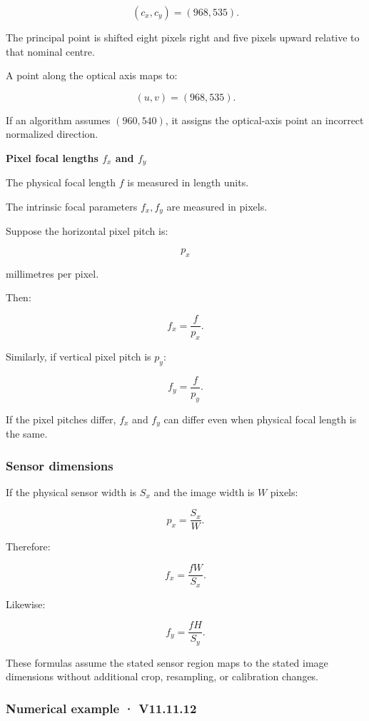 \[
 (c_x,c_y)=(968,535).
\]

The principal point is shifted eight pixels right and five pixels upward relative to that nominal centre.

A point along the optical axis maps to:

\[
 \boxed{(u,v)=(968,535)}.
\]

If an algorithm assumes \((960,540)\), it assigns the optical-axis point an incorrect normalized direction.

\textbf{Pixel focal lengths \(f_x\) and \(f_y\)}

The physical focal length \(f\) is measured in length units.

The intrinsic focal parameters \(f_x,f_y\) are measured in pixels.

Suppose the horizontal pixel pitch is:

\[
 p_x
\]

millimetres per pixel.

Then:

\[
 \boxed{ f_x=\frac f{p_x} }.
\]

Similarly, if vertical pixel pitch is \(p_y\):

\[
 \boxed{ f_y=\frac f{p_y} }.
\]

If the pixel pitches differ, \(f_x\) and \(f_y\) can differ even when physical focal length is the same.

\subsubsection{Sensor dimensions}\label{sensor-dimensions}

If the physical sensor width is \(S_x\) and the image width is \(W\) pixels:

\[
 p_x=\frac{S_x}{W}.
\]

Therefore:

\[
 \boxed{ f_x=\frac{fW}{S_x} }.
\]

Likewise:

\[
 \boxed{ f_y=\frac{fH}{S_y} }.
\]

These formulas assume the stated sensor region maps to the stated image dimensions without additional crop, resampling, or calibration changes.

\subsubsection{Numerical example · V11.11.12}\label{numerical-example-v11.11.12}

